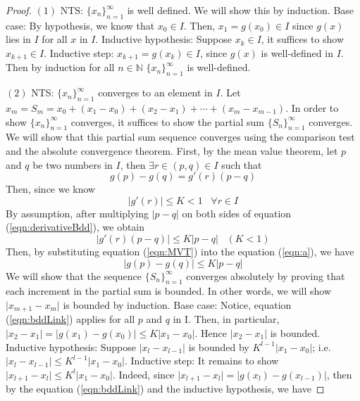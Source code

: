 \documentclass{article}
\theoremstyle{definition}
\theoremstyle{remark}
\theoremstyle{example}
\begin{document}
\begin{proof}
    \cite{r_kent_nagle_fundamentals_2011}$(1)$ NTS: $\{x_n\}_{n = 1}^{\infty}$ is well defined. \; We will show this by induction. Base case: By hypothesis, we know that $x_0 \in I$. Then, $x_1 = g(x_0) \in I$ since $g(x)$ lies in $I$ for all $x$ in $I$. Inductive hypothesis: Suppose $x_k \in I$, it suffices to show $x_{k+1} \in I$. Inductive step: $x_{k+1} = g(x_k) \in I$, since $g(x)$ is well-defined in $I$. Then by induction for all $n \in \mathbb{N}$ $\{x_n\}_{n = 1}^{\infty}$ is well-defined.
    
    $(2)$ NTS: $\{x_n\}_{n = 1}^{\infty}$ converges to an element in $I$. \; Let $x_m = S_m = x_0 + (x_1 - x_0) + (x_2 - x_1) + \cdots + (x_m - x_{m-1})$. In order to show $\{x_n\}_{n = 1}^{\infty}$ converges, it suffices to show the partial sum $\{S_n\}_{n = 1}^{\infty}$ converges. We will show that this partial sum sequence converges using the comparison test and the absolute convergence theorem. First, by the mean value theorem, let $p$ and $q$ be two numbers in $I$, then $\exists r \in (p,q) \in I$ such that
    \begin{equation}\label{eqn:MVT}
        g(p) - g(q) = g'(r)(p - q)
    \end{equation}
    Then, since we know 
    \begin{equation}\label{eqn:derivativeBdd}
        \lvert g'(r) \rvert \leq K < 1 \;\;\; \forall r \in I
    \end{equation}
    By assumption, after multiplying $\lvert p - q \rvert$ on both sides of equation (\ref{eqn:derivativeBdd}), we obtain 
    \begin{equation}\label{eqn:a}
        \lvert g'(r)(p-q) \rvert \leq K \lvert p - q \rvert \;\;\; (K < 1)
    \end{equation}
    Then, by substituting equation (\ref{eqn:MVT}) into the equation (\ref{eqn:a}), we have 
    \begin{equation}\label{eqn:bddLink}
        \lvert g(p) - g(q) \rvert \leq K \lvert p - q \rvert
    \end{equation}
    We will show that the sequence $\{S_n\}_{n = 1}^{\infty}$ converges absolutely by proving that each increment in the partial sum is bounded. In other words, we will show $\lvert x_{m+1} - x_{m}\rvert$ is bounded by induction. Base case: Notice, equation (\ref{eqn:bddLink}) applies for all $p$ and $q$ in I. Then, in particular, $\lvert x_2 - x_1 \rvert = \lvert g(x_1) - g(x_0) \rvert \leq K \lvert x_1 - x_0 \rvert$. Hence $\lvert x_2 - x_1 \rvert$ is bounded. Inductive hypothesis: Suppose $\lvert x_{l} - x_{l-1} \rvert$ is bounded by $K^{l-1} \rvert x_1 - x_0 \rvert$; i.e. $\lvert x_{l} - x_{l-1} \rvert \leq K^{l-1} \rvert x_1 - x_0 \rvert$. Inductive step: It remains to show $\lvert x_{l+1} - x_{l} \rvert \leq K^{l} \rvert x_1 - x_0 \rvert$. Indeed, since $\rvert x_{l + 1} - x_l \rvert = \lvert g(x_l) - g(x_{l-1}) \rvert$, then by the equation (\ref{eqn:bddLink}) and the inductive hypothesis, we have

\end{proof}
\end{document}
